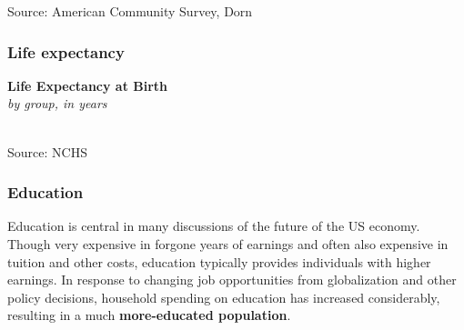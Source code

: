 \documentclass{report}
\makeatletter
\newcommand{\tbllink}[1]{\href{https://raw.githubusercontent.com/bdecon/US-chartbook/master/chartbook/data/#1}{\faTable}}
\newcommand*\short[1]{\expandafter\@gobbletwo\number\numexpr#1\relax}
\newcommand{\absnode}[3]{\node[below right, align=left] at (axis cs: #1,#2) {#3};}
\newcommand{\shdateaxisticks}{
		date coordinates in=x, axis line style={draw=none},
		xmax={2022-03-15},
		max space between ticks=40,	    
		xtick={{1990-01-01}, {1995-01-01}, {2000-01-01}, 
			{2005-01-01}, {2010-01-01}, {2015-01-01}, {2020-01-01}},
		minor xtick={},
		enlarge y limits={0.06}, enlarge x limits={0.01},
		}
\newcommand{\bbar}[2]{extra #1 ticks = {{#2}}, extra #1 tick labels = ,
		extra #1 tick style = {grid=major, grid style={thick, black!25}},}
\newcommand{\thickline}[4]{\addplot[ultra thick, no markers, color=#1] 
		table [x=#2, y=#3, col sep=comma] {#4};	}
\newcommand{\rbars}{
		\fill[color=black!10] (axis cs:{1990-07-01},\pgfkeysvalueof{/pgfplots/ymin}) rectangle 
			(axis cs:{1991-03-01}, \pgfkeysvalueof{/pgfplots/ymax});
		\fill[color=black!10] (axis cs:{2007-12-01},\pgfkeysvalueof{/pgfplots/ymin}) rectangle 
			(axis cs:{2009-07-01}, \pgfkeysvalueof{/pgfplots/ymax});
		\fill[color=black!10] (axis cs:{2001-03-01},\pgfkeysvalueof{/pgfplots/ymin}) rectangle 
			(axis cs:{2001-11-01}, \pgfkeysvalueof{/pgfplots/ymax});
		\fill[color=black!10] (axis cs:{2020-02-01},\pgfkeysvalueof{/pgfplots/ymin}) rectangle 
			(axis cs:{2020-05-01}, \pgfkeysvalueof{/pgfplots/ymax});}
\makeatother
\begin{document}
{\vspace{-3mm}
\hspace{-9mm}  \hspace{-3mm} 

\vspace{-4mm}
\footnotesize{Source: American Community Survey, Dorn} \hspace{61mm} \tbllink{acs_cz_age.csv}
\vspace{3.5mm}

\begin{minipage}{0.76\textwidth}
\subsubsection*{Life expectancy}
\vspace{-0.5mm}

\small 

\begin{minipage}{0.435\textwidth} 
\normalsize \textbf{Life Expectancy at Birth}\\
\footnotesize{\textit{by group, in years}}\\
\noindent \hspace*{-2mm} \\
\footnotesize{Source: NCHS} \hfill \tbllink{life_exp.csv}\end{minipage}\hfill
\begin{minipage}{0.5\textwidth}
\small 
\end{minipage}
\end{minipage}
\newpage
\begin{minipage}{0.76\textwidth}
\subsubsection*{Education}
\small Education is central in many discussions of the future of the US economy. Though very expensive in forgone years of earnings and often also expensive in tuition and other costs, education typically provides individuals with higher earnings. In response to changing job opportunities from globalization and other policy decisions, household spending on education has increased considerably, resulting in a much \textbf{more-educated population}.
\end{minipage}
\vspace{1mm}

}
\end{document}
